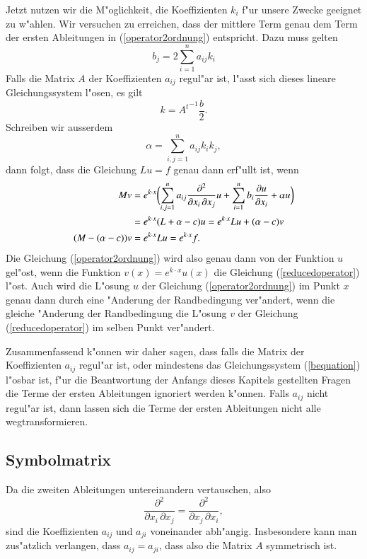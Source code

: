 Jetzt nutzen wir die M"oglichkeit, die Koeffizienten $k_i$ f"ur unsere
Zwecke geeignet zu w"ahlen.
Wir versuchen zu erreichen, dass der mittlere Term genau dem Term 
der ersten Ableitungen in (\ref{operator2ordnung}) entspricht.
Dazu muss gelten
\begin{equation}
b_j=2\sum_{i=1}^n a_{ij}k_i
\label{bequation}
\end{equation}
Falls die Matrix $A$ der Koeffizienten $a_{ij}$ regul"ar ist, l"asst
sich dieses lineare Gleichungssystem l"osen, es gilt
\[
k=
{A^t}^{-1}
\frac{b}2.
\]
Schreiben wir ausserdem
\[
\alpha = \sum_{i,j=1}^n a_{ij}k_ik_j,
\]
dann folgt, dass die Gleichung $Lu=f$ genau dann erf"ullt ist, wenn
\begin{align}
Mv
&=
e^{k\cdot x}\biggl(
\sum_{i,j=1}^n a_{ij}\frac{\partial^2}{\partial x_i\,\partial x_j}u
+\sum_{i=1}^n b_i\frac{\partial u}{\partial x_i}+\alpha u
\biggr)
\\
&=
e^{k\cdot x}
(L+\alpha -c)u
=
e^{k\cdot x}Lu + (\alpha -c)v
\notag
\\
(M-(\alpha - c))v&=e^{k\cdot x}Lu=e^{k\cdot x}f.
\label{reducedoperator}
\end{align}
Die Gleichung (\ref{operator2ordnung}) wird also genau dann von der
Funktion $u$ gel"ost, wenn die Funktion $v(x)=e^{k\cdot x}u(x)$ 
die Gleichung (\ref{reducedoperator}) l"ost.
Auch wird die L"osung $u$ der Gleichung (\ref{operator2ordnung})
im Punkt $x$ 
genau dann durch eine "Anderung der Randbedingung ver"andert, 
wenn die gleiche "Anderung der Randbedingung die L"osung $v$ 
der Gleichung (\ref{reducedoperator}) im selben Punkt ver"andert.

Zusammenfassend k"onnen wir daher sagen, dass falls die Matrix der
Koeffizienten $a_{ij}$ regul"ar ist, oder mindestens das Gleichungssystem
(\ref{bequation}) l"osbar ist, f"ur die Beantwortung der Anfangs
dieses Kapitels gestellten Fragen die Terme der ersten Ableitungen
ignoriert werden k"onnen.
Falls $a_{ij}$ nicht regul"ar ist, dann lassen sich die Terme der
ersten Ableitungen nicht alle wegtransformieren.

\subsection{Symbolmatrix}
Da die zweiten Ableitungen untereinandern vertauschen, also 
\[
\frac{\partial^2}{\partial x_i\,\partial x_j}
=
\frac{\partial^2}{\partial x_j\,\partial x_i},
\]
sind die Koeffizienten $a_{ij}$ und $a_{ji}$ voneinander abh"angig.
Insbesondere kann man zus"atzlich verlangen, dass $a_{ij}=a_{ji}$,
dass also die Matrix $A$ symmetrisch ist.

